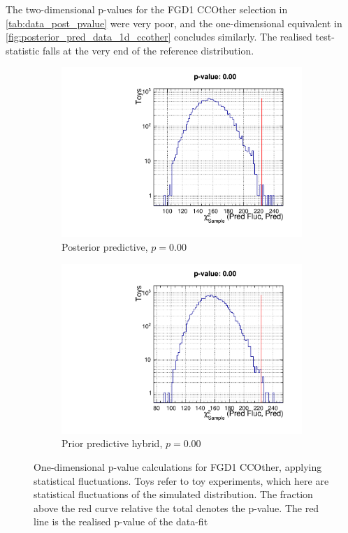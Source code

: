 The two-dimensional p-values for the FGD1 CCOther selection in \autoref{tab:data_post_pvalue} were very poor, and the one-dimensional equivalent in \autoref{fig:posterior_pred_data_1d_ccother} concludes similarly. The realised test-statistic falls at the very end of the reference distribution.
\begin{figure}[h]
	\begin{subfigure}[t]{0.49\textwidth}
		\includegraphics[width=\textwidth, trim={0mm 0mm 0mm 14mm}, clip,page=1]{figures/mach3/data/postpred/pvalue_posteriorpred_fgd1ccother_1d}
		\caption{Posterior predictive, $p=0.00$}
	\end{subfigure}
	\begin{subfigure}[t]{0.49\textwidth}
		\includegraphics[width=\textwidth, trim={0mm 0mm 0mm 14mm}, clip,page=1]{figures/mach3/data/postpred/prior_pred_fgd1ccother}
		\caption{Prior predictive hybrid, $p=0.00$}
	\end{subfigure}
	\caption{One-dimensional p-value calculations for FGD1 CCOther, applying statistical fluctuations. Toys refer to toy experiments, which here are statistical fluctuations of the simulated distribution. The fraction above the red curve relative the total denotes the p-value. The red line is the realised p-value of the data-fit}
	\label{fig:posterior_pred_data_1d_ccother}
\end{figure}

